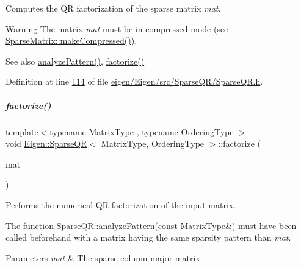 Computes the QR factorization of the sparse matrix {\itshape mat}.

\begin{DoxyWarning}{Warning}
The matrix {\itshape mat} must be in compressed mode (see \hyperlink{group___sparse_core___module_a5ff54ffc10296f9466dc81fa888733fd}{Sparse\+Matrix\+::make\+Compressed()}).
\end{DoxyWarning}
\begin{DoxySeeAlso}{See also}
\hyperlink{group___sparse_q_r___module_a4b425ddb1358c914d764cde48853a4f6}{analyze\+Pattern()}, \hyperlink{group___sparse_q_r___module_a55a34bacf05bd30a1dacbccad9f03c6d}{factorize()} 
\end{DoxySeeAlso}


Definition at line \hyperlink{eigen_2_eigen_2src_2_sparse_q_r_2_sparse_q_r_8h_source_l00114}{114} of file \hyperlink{eigen_2_eigen_2src_2_sparse_q_r_2_sparse_q_r_8h_source}{eigen/\+Eigen/src/\+Sparse\+Q\+R/\+Sparse\+Q\+R.\+h}.

\mbox{\label{group___sparse_q_r___module_a55a34bacf05bd30a1dacbccad9f03c6d}} 
\subparagraph{\texorpdfstring{factorize()}{factorize()}}
{\footnotesize\ttfamily template$<$typename Matrix\+Type , typename Ordering\+Type $>$ \\
void \hyperlink{group___sparse_q_r___module_class_eigen_1_1_sparse_q_r}{Eigen\+::\+Sparse\+QR}$<$ Matrix\+Type, Ordering\+Type $>$\+::factorize (\begin{DoxyParamCaption}\item[{const Matrix\+Type \&}]{mat }\end{DoxyParamCaption})}



Performs the numerical QR factorization of the input matrix. 

The function \hyperlink{group___sparse_q_r___module_a4b425ddb1358c914d764cde48853a4f6}{Sparse\+Q\+R\+::analyze\+Pattern(const Matrix\+Type\&)} must have been called beforehand with a matrix having the same sparsity pattern than {\itshape mat}.


\begin{DoxyParams}{Parameters}
{\em mat} & The sparse column-\/major matrix \\
\hline
\end{DoxyParams}


